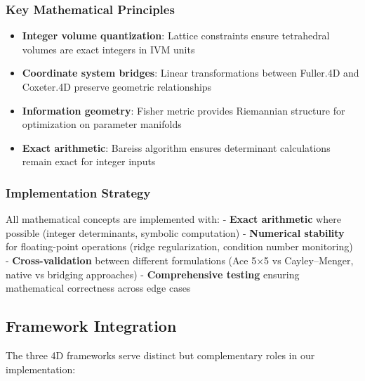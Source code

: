 \documentclass[
  10pt,
]{article}
\providecommand{\tightlist}{%
  \setlength{\itemsep}{0pt}\setlength{\parskip}{0pt}}
\begin{document}
\hypertarget{key-mathematical-principles}{%
\subsubsection{Key Mathematical
Principles}\label{key-mathematical-principles}}

\begin{itemize}
\tightlist
\item
  \textbf{Integer volume quantization}: Lattice constraints ensure
  tetrahedral volumes are exact integers in IVM units
\item
  \textbf{Coordinate system bridges}: Linear transformations between
  Fuller.4D and Coxeter.4D preserve geometric relationships
\item
  \textbf{Information geometry}: Fisher metric provides Riemannian
  structure for optimization on parameter manifolds
\item
  \textbf{Exact arithmetic}: Bareiss algorithm ensures determinant
  calculations remain exact for integer inputs
\end{itemize}

\hypertarget{implementation-strategy}{%
\subsubsection{Implementation Strategy}\label{implementation-strategy}}

All mathematical concepts are implemented with: - \textbf{Exact
arithmetic} where possible (integer determinants, symbolic computation)
- \textbf{Numerical stability} for floating-point operations (ridge
regularization, condition number monitoring) - \textbf{Cross-validation}
between different formulations (Ace 5×5 vs Cayley--Menger, native vs
bridging approaches) - \textbf{Comprehensive testing} ensuring
mathematical correctness across edge cases

\hypertarget{framework-integration}{%
\subsection{Framework Integration}\label{framework-integration}}

The three 4D frameworks serve distinct but complementary roles in our
implementation:
\end{document}
